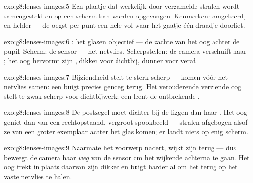 \begin{solution}{exo:g8:lenses-images:5}
Een plaatje dat werkelijk door verzamelde stralen wordt samengesteld en
op een scherm kan worden opgevangen. Kenmerken: omgekeerd, en helder
--- de  oogst per punt een hele  vol
 waar het gaatje één draadje doorliet.
\end{solution}

\begin{solution}{exo:g8:lenses-images:6}
: het glazen objectief --- de zachte
 van het oog achter de pupil. Scherm: de sensor --- het
netvlies. Scherpstellen: de camera verschuift haar
; het oog hervormt zijn , dikker voor
dichtbij, dunner voor veraf.
\end{solution}

\begin{solution}{exo:g8:lenses-images:7}
Bijziendheid stelt te sterk scherp ---  komen vóór het
netvlies samen: een  buigt precies genoeg
terug. Het verouderende verziende oog stelt te zwak scherp voor
dichtbijwerk: een  leent de ontbrekende
.
\end{solution}

\begin{solution}{exo:g8:lenses-images:8}
De postzegel moet dichter bij de  liggen dan haar
. Het oog geniet dan van een rechtopstaand,
vergroot spookbeeld --- stralen afgebogen alsof ze van een groter
exemplaar achter het glas komen; er landt niets op enig scherm.
\end{solution}

\begin{solution}{exo:g8:lenses-images:9}
Naarmate het voorwerp nadert, wijkt zijn  terug --- dus
beweegt de camera haar  \emph{weg} van de sensor om het
wijkende  achterna te gaan. Het oog trekt in plaats
daarvan zijn  dikker en buigt harder af om het
 terug op het vaste netvlies te halen.
\end{solution}

